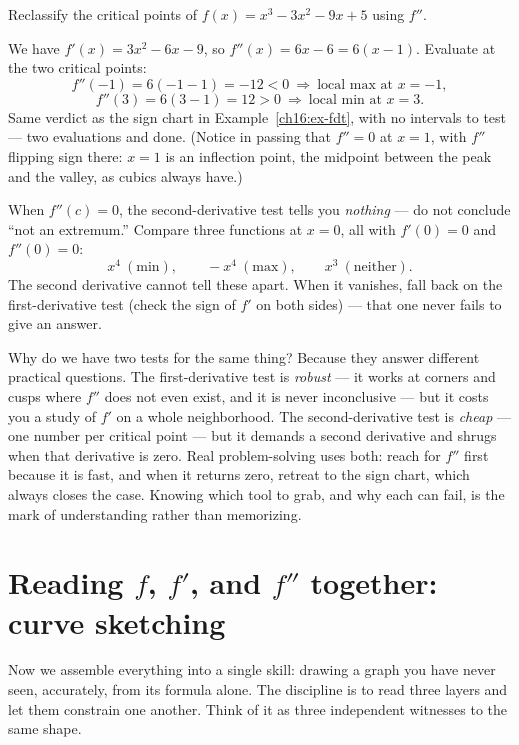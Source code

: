 \begin{example}\label{ch16:ex-sdt}
Reclassify the critical points of $f(x)=x^3-3x^2-9x+5$ using $f''$.

\smallskip
We have $f'(x)=3x^2-6x-9$, so $f''(x)=6x-6=6(x-1)$. Evaluate at the two critical
points:
\[
f''(-1)=6(-1-1)=-12<0 \ \Rightarrow\ \text{local max at }x=-1,
\]
\[
f''(3)=6(3-1)=12>0 \ \Rightarrow\ \text{local min at }x=3.
\]
Same verdict as the sign chart in Example~\ref{ch16:ex-fdt}, with no intervals to
test --- two evaluations and done. (Notice in passing that $f''=0$ at $x=1$, with
$f''$ flipping sign there: $x=1$ is an inflection point, the midpoint between the
peak and the valley, as cubics always have.)
\end{example}

\begin{trapbox}
When $f''(c)=0$, the second-derivative test tells you \emph{nothing} --- do not
conclude ``not an extremum.'' Compare three functions at $x=0$, all with $f'(0)=0$
and $f''(0)=0$:
\[
x^4 \ (\text{min}),\qquad -x^4 \ (\text{max}),\qquad x^3 \ (\text{neither}).
\]
The second derivative cannot tell these apart. When it vanishes, fall back on the
first-derivative test (check the sign of $f'$ on both sides) --- that one never
fails to give an answer.
\end{trapbox}

\begin{aestheticbox}
Why do we have two tests for the same thing? Because they answer different
practical questions. The first-derivative test is \emph{robust} --- it works at
corners and cusps where $f''$ does not even exist, and it is never inconclusive ---
but it costs you a study of $f'$ on a whole neighborhood. The second-derivative
test is \emph{cheap} --- one number per critical point --- but it demands a second
derivative and shrugs when that derivative is zero. Real problem-solving uses both:
reach for $f''$ first because it is fast, and when it returns zero, retreat to the
sign chart, which always closes the case. Knowing which tool to grab, and why each
can fail, is the mark of understanding rather than memorizing.
\end{aestheticbox}

\section{Reading $f$, $f'$, and $f''$ together: curve sketching}

Now we assemble everything into a single skill: drawing a graph you have never
seen, accurately, from its formula alone. The discipline is to read three layers
and let them constrain one another. Think of it as three independent witnesses to
the same shape.

